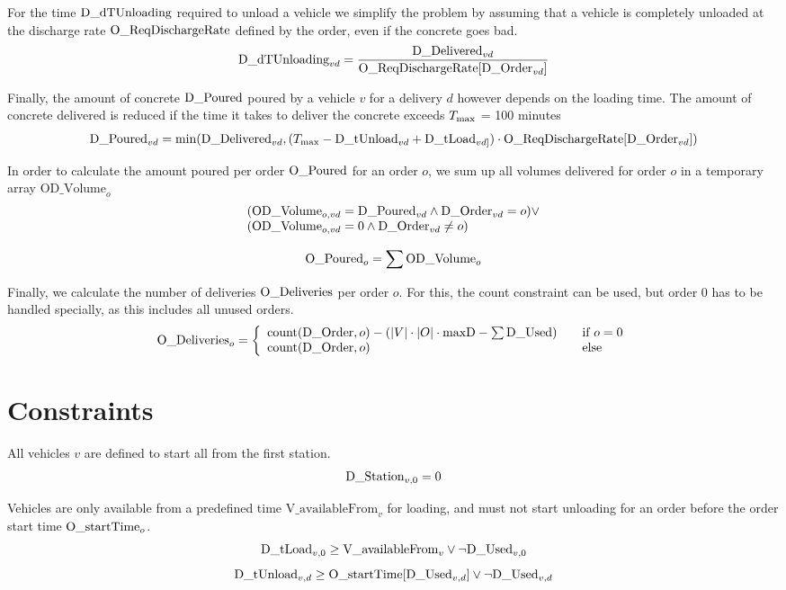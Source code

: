 \documentclass[a4paper]{article}
\begin{document}
For the time $\text{D\_dTUnloading}$ required to unload a vehicle we simplify the problem by assuming that a vehicle is
completely unloaded at the discharge rate $\text{O\_ReqDischargeRate}$ defined by the order, even if the concrete goes bad.
\[
\text{D\_dTUnloading}_{vd} = \frac{\text{D\_Delivered}_{vd}}{ \text{O\_ReqDischargeRate}[ \text{D\_Order}_{vd} ]}
\]

Finally, the amount of concrete $\text{D\_Poured}$ poured by a vehicle $v$ for a delivery $d$ however depends on the loading time. The amount of concrete delivered
is reduced if the time it takes to deliver the concrete exceeds $T_\text{max}$ = 100 minutes
\[
\text{D\_Poured}_{vd} = \min( \text{D\_Delivered}_{vd}, (T_\text{max} - \text{D\_tUnload}_{vd} + \text{D\_tLoad}_{vd]}) \cdot \text{O\_ReqDischargeRate}[\text{D\_Order}_{vd}] ) 
\]

\newcommand{\ODVolume}{\text{OD\_Volume}}

In order to calculate the amount poured per order $\text{O\_Poured}$ for an order $o$, we sum up all volumes delivered for order $o$ in a
temporary array $\ODVolume_o$
\[
\begin{array}[b]{l}
(\ODVolume_{o,vd} = \DPoured_{vd} \wedge \DOrder_{vd} = o) \vee \\
(\ODVolume_{o,vd} = 0 \wedge \DOrder_{vd} \not = o)
\end{array}
\]

\[
\OPoured_o = \sum{\ODVolume_o} 
\]

Finally, we calculate the number of deliveries $\text{O\_Deliveries}$ per order $o$. For this, the count constraint can be used, but
order 0 has to be handled specially, as this includes all unused orders. 
\[
\text{O\_Deliveries}_o = \left\{
\begin{array}{l l}
\text{count}(\text{D\_Order}, o) - (|V| \cdot |O| \cdot \text{maxD} - \sum{\text{D\_Used}}) & \quad \text{if $o = 0$} \\
\text{count}(\text{D\_Order}, o) & \quad \text{else}
\end{array}
\right.
\]

\section{Constraints}

All vehicles $v$ are defined to start all from the first station.
\[
\text{D\_Station}_{v,0} = 0
\]

Vehicles are only available from a predefined time $\text{V\_availableFrom}_v$ for loading, and must not start unloading for an order before the 
order start time $\text{O\_startTime}_o$.
\[
\text{D\_tLoad}_{v,0} \geq \text{V\_availableFrom}_v \vee \neg \text{D\_Used}_{v,0}
\]
\[
\text{D\_tUnload}_{v,d} \geq \text{O\_startTime}[ \text{D\_Used}_{v,d} ] \vee \neg \text{D\_Used}_{v,d}
\]
\end{document}
